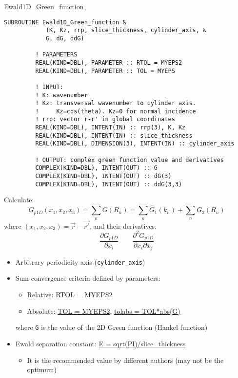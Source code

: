 \begin{frame}{\url{Ewald1D_Green_function}}
  
  \begin{lstlisting}[style=myFORTRANcodeS]
      SUBROUTINE Ewald1D_Green_function &
            (K, Kz, rrp, slice_thickness, cylinder_axis, &
            G, dG, ddG)

         ! PARAMETERS
         REAL(KIND=DBL), PARAMETER :: RTOL = MYEPS2
         REAL(KIND=DBL), PARAMETER :: TOL = MYEPS

         ! INPUT:
         ! K: wavenumber
         ! Kz: transversal wavenumber to cylinder axis.
         !     Kz=cos(theta). Kz=0 for normal incidence
         ! rrp: vector r-r' in global coordinates
         REAL(KIND=DBL), INTENT(IN) :: rrp(3), K, Kz
         REAL(KIND=DBL), INTENT(IN) :: slice_thickness
         REAL(KIND=DBL), DIMENSION(3), INTENT(IN) :: cylinder_axis

         ! OUTPUT: complex green function value and derivatives
         COMPLEX(KIND=DBL), INTENT(OUT) :: G 
         COMPLEX(KIND=DBL), INTENT(OUT) :: dG(3)
         COMPLEX(KIND=DBL), INTENT(OUT) :: ddG(3,3)
  \end{lstlisting}

  Calculate:
  \[
    G_{p1D}(x_1,x_2,x_3)=\sum_n G(R_n) = \sum_n \hat{G}_1(k_n) + \sum_n G_2(R_n)
  \]
  where \((x_1,x_2,x_3)=\vec{r} - \vec{r'}\), and their derivatives:
  \[
    \frac{\partial G_{p1D}}{\partial x_i} \qquad \frac{\partial^2 G_{p1D}}{\partial x_i\partial x_j}
  \]

  \begin{itemize}\small
    \item Arbitrary periodicity axis ({\lstinline!cylinder_axis!}) 
    \item Sum convergence criteria defined by parameters:
      \begin{itemize}\footnotesize
        \item Relative: {\url{RTOL = MYEPS2}}
        \item Absolute: {\url{TOL = MYEPS2}}, {\url{tolabs = TOL*abs(G)}}
      \end{itemize}
      where {\lstinline!G!} is the value of the 2D Green function (Hankel function)
    \item Ewald separation constant: 
      {\url{E = sqrt(PI)/slice_thickness}}
      \begin{itemize}\footnotesize
        \item It is the recommended value by different authors (may not be the optimum)
      \end{itemize}
  \end{itemize}


\end{frame}

